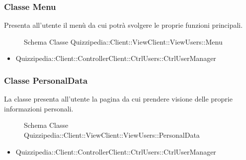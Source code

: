 \subsubsection{Classe Menu}
Presenta all'utente il menù da cui potrà svolgere le proprie funzioni principali.
\begin{figure}[H]
\centering
\noindent{}
\caption[Schema Classe Menu]{Schema Classe Quizzipedia::Client::ViewClient::ViewUsers::Menu}
\end{figure}
\begin{itemize}
\item Quizzipedia::Client::ControllerClient::CtrlUsers::CtrlUserManager
\end{itemize}
\subsubsection{Classe PersonalData}
La classe presenta all'utente la pagina da cui prendere visione delle proprie informazioni personali.
\begin{figure}[H]
\centering
\noindent{}
\caption[Schema Classe PersonalData]{Schema Classe Quizzipedia::Client::ViewClient::ViewUsers::PersonalData}
\end{figure}
\begin{itemize}
\item Quizzipedia::Client::ControllerClient::CtrlUsers::CtrlUserManager
\end{itemize}
